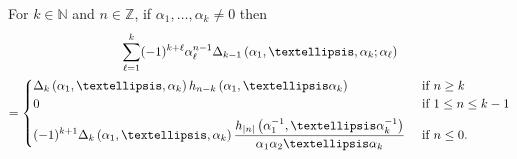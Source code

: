 \documentclass[10pt,a4paper]{amsart}
\begin{document}
\begin{lemma}\label{lem:vandermonde}
For $k\in \mathbb{N}$ and $n\in \mathbb{Z}$, if $\alpha_1,\dots,\alpha_k \neq 0$ then
\begin{multline*}
\sum_{\ell=1}^k (-1)^{k+\ell}   \alpha_\ell^{n-1}  \Delta_{k-1}\left(\alpha_1,\dots,\alpha_k ; \alpha_\ell\right)\\
=
\begin{cases}
\displaystyle \Delta_{k}\left(\alpha_1,\dots,\alpha_{k}\right) h_{n-k}\left(\alpha_1, \dots \alpha_k\right) & \text{ if } n \geq k \\
0 & \text{ if } 1\leq n \leq k-1 \\
\noalign{\vskip1ex}
\displaystyle (-1)^{k+1} \Delta_{k}\left(\alpha_1,\dots,\alpha_{k}\right)   \frac{ h_{|n|}\left(\alpha_1^{-1}, \dots \alpha_k^{-1}\right)}{\alpha_1 \alpha_2 \dots \alpha_k} & \text{ if } n \leq 0.
\end{cases}
\end{multline*}
\end{lemma}
\end{document}
